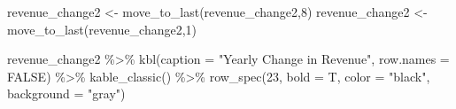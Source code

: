 \documentclass[
  letterpaper,
  DIV=11,
  numbers=noendperiod]{scrreport}
\newenvironment{Shaded}{\begin{snugshade}}{\end{snugshade}}
\newcommand{\AttributeTok}[1]{\textcolor[rgb]{0.40,0.45,0.13}{#1}}
\newcommand{\ConstantTok}[1]{\textcolor[rgb]{0.56,0.35,0.01}{#1}}
\newcommand{\DecValTok}[1]{\textcolor[rgb]{0.68,0.00,0.00}{#1}}
\newcommand{\FunctionTok}[1]{\textcolor[rgb]{0.28,0.35,0.67}{#1}}
\newcommand{\NormalTok}[1]{\textcolor[rgb]{0.00,0.23,0.31}{#1}}
\newcommand{\OtherTok}[1]{\textcolor[rgb]{0.00,0.23,0.31}{#1}}
\newcommand{\SpecialCharTok}[1]{\textcolor[rgb]{0.37,0.37,0.37}{#1}}
\newcommand{\StringTok}[1]{\textcolor[rgb]{0.13,0.47,0.30}{#1}}
\begin{document}
\begin{Shaded}
\begin{Highlighting}[]
\NormalTok{revenue\_change2 }\OtherTok{\textless{}{-}} \FunctionTok{move\_to\_last}\NormalTok{(revenue\_change2,}\DecValTok{8}\NormalTok{)}
\NormalTok{revenue\_change2 }\OtherTok{\textless{}{-}} \FunctionTok{move\_to\_last}\NormalTok{(revenue\_change2,}\DecValTok{1}\NormalTok{)}

\NormalTok{revenue\_change2 }\SpecialCharTok{\%\textgreater{}\%} 
  \FunctionTok{kbl}\NormalTok{(}\AttributeTok{caption =} \StringTok{"Yearly Change in Revenue"}\NormalTok{, }\AttributeTok{row.names =} \ConstantTok{FALSE}\NormalTok{) }\SpecialCharTok{\%\textgreater{}\%} 
   \FunctionTok{kable\_classic}\NormalTok{() }\SpecialCharTok{\%\textgreater{}\%}
    \FunctionTok{row\_spec}\NormalTok{(}\DecValTok{23}\NormalTok{, }\AttributeTok{bold =}\NormalTok{ T, }\AttributeTok{color =} \StringTok{"black"}\NormalTok{, }\AttributeTok{background =} \StringTok{"gray"}\NormalTok{)}
\end{Highlighting}
\end{Shaded}
\end{document}
